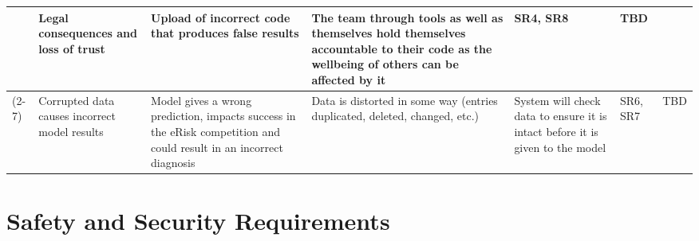 \documentclass{article}
\begin{document}
\begin{landscape}
\begin{longtable}{|p{}|p{}|p{}|p{}|p{}|p{}|p{}|}
        & Legal consequences and loss of trust 
        & Upload of incorrect code that produces false results
        & The team through tools as well as themselves hold themselves accountable to their code as the wellbeing of others can be affected by it
        & SR4, SR8
        & TBD \\
        \cline(2-7)
        & Corrupted data causes incorrect model results
        & Model gives a wrong prediction, impacts success in the eRisk competition and could result in an incorrect diagnosis
        & Data is distorted in some way (entries duplicated, deleted, changed, etc.)
        & System will check data to ensure it is intact before it is given to the model
        & SR6, SR7
        & TBD \\
        \hline
    \end{longtable}
\end{landscape}


\section{Safety and Security Requirements}
\end{document}
